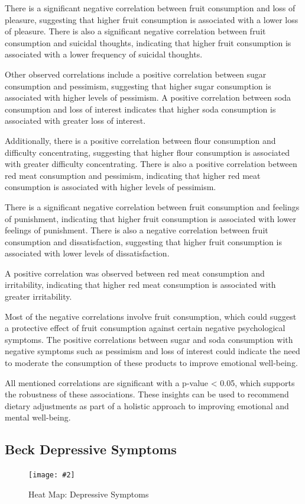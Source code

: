 \documentclass[jou]{apa7}
\newcommand{\includegraphicsmax}[2][]{%
	\texttt{[image: \#2]}%
}
\begin{document}
There is a significant negative correlation between fruit consumption and loss of pleasure, suggesting that higher fruit consumption is associated with a lower loss of pleasure. There is also a significant negative correlation between fruit consumption and suicidal thoughts, indicating that higher fruit consumption is associated with a lower frequency of suicidal thoughts.

Other observed correlations include a positive correlation between sugar consumption and pessimism, suggesting that higher sugar consumption is associated with higher levels of pessimism. A positive correlation between soda consumption and loss of interest indicates that higher soda consumption is associated with greater loss of interest.

Additionally, there is a positive correlation between flour consumption and difficulty concentrating, suggesting that higher flour consumption is associated with greater difficulty concentrating. There is also a positive correlation between red meat consumption and pessimism, indicating that higher red meat consumption is associated with higher levels of pessimism.

There is a significant negative correlation between fruit consumption and feelings of punishment, indicating that higher fruit consumption is associated with lower feelings of punishment. There is also a negative correlation between fruit consumption and dissatisfaction, suggesting that higher fruit consumption is associated with lower levels of dissatisfaction.

A positive correlation was observed between red meat consumption and irritability, indicating that higher red meat consumption is associated with greater irritability.

Most of the negative correlations involve fruit consumption, which could suggest a protective effect of fruit consumption against certain negative psychological symptoms. The positive correlations between sugar and soda consumption with negative symptoms such as pessimism and loss of interest could indicate the need to moderate the consumption of these products to improve emotional well-being.

All mentioned correlations are significant with a p-value \textless{} 0.05, which supports the robustness of these associations. These insights can be used to recommend dietary adjustments as part of a holistic approach to improving emotional and mental well-being.


\subsection{Beck Depressive Symptoms}
\begin{figure}[!ht]
	\centering
	\includegraphicsmax{sintomasDepresivosBeckGraph.pdf}
	\caption{Heat Map: Depressive Symptoms}
	\label{fig:Figure2}
\end{figure}
\vspace{-1em} %
\end{document}
